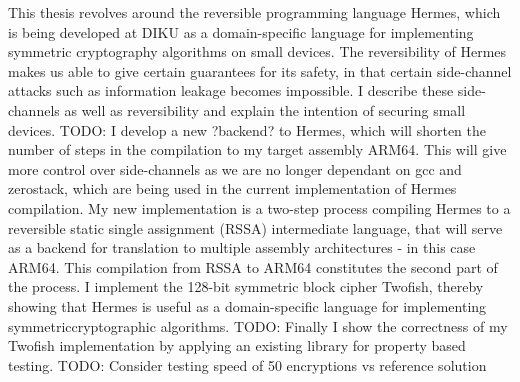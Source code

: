 This thesis revolves around the reversible programming language Hermes, which is being developed at DIKU as a domain-specific language for implementing symmetric cryptography algorithms on small devices.
The reversibility of Hermes makes us able to give certain guarantees for its safety, in that certain side-channel attacks such as information leakage becomes impossible.
I describe these side-channels as well as reversibility and explain the intention of securing small devices.
TODO: I develop a new ?backend? to Hermes, which will shorten the number of steps in the compilation to my target assembly ARM64. This will give more control over side-channels as we are no longer dependant on gcc and zerostack, which are being used in the current implementation of Hermes compilation.
My new implementation is a two-step process compiling Hermes to a reversible static single assignment (RSSA) intermediate language, that will serve as a backend for translation to multiple assembly architectures - in this case ARM64. This compilation from RSSA to ARM64 constitutes the second part of the process.
I implement the 128-bit symmetric block cipher Twofish, thereby showing that Hermes is useful as a domain-specific language for implementing symmetriccryptographic algorithms.
TODO: Finally I show the correctness of my Twofish implementation by applying an existing library for property based testing.
TODO: Consider testing speed of 50 encryptions vs reference solution
